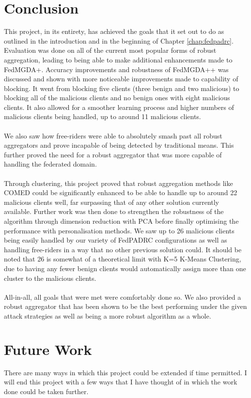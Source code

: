 \section{Conclusion}
This project, in its entirety, has achieved the goals that it set out to do as outlined in the introduction and in the beginning of Chapter \ref{chap:fedpadrc}.
Evaluation was done on all of the current most popular forms of robust aggregation, leading to being able to make additional enhancements made to FedMGDA+.
Accuracy improvements and robustness of FedMGDA++ was discussed and shown with more noticeable improvements made to capability of blocking.
It went from blocking five clients (three benign and two malicious) to blocking all of the malicious clients and no benign ones with eight malicious clients.
It also allowed for a smoother learning process and higher numbers of malicious clients being handled, up to around 11 malicious clients.
\\ \\
We also saw how free-riders were able to absolutely smash past all robust aggregators and prove incapable of being detected by traditional means.
This further proved the need for a robust aggregator that was more capable of handling the federated domain.
\\ \\
Through clustering, this project proved that robust aggregation methods like COMED could be significantly enhanced to be able to handle up to around 22 malicious clients well, far surpassing that of any other solution currently available.
Further work was then done to strengthen the robustness of the algorithm through dimension reduction with PCA before finally optimising the performance with personalisation methods.
We saw up to 26 malicious clients being easily handled by our variety of FedPADRC configurations as well as handling free-riders in a way that no other previous solution could.
It should be noted that 26 is somewhat of a theoretical limit with K=5 K-Means Clustering, due to having any fewer benign clients would automatically assign more than one cluster to the malicious clients.
\\ \\
All-in-all, all goals that were met were comfortably done so.
We also provided a robust aggregator that has been shown to be the best performing under the given attack strategies as well as being a more robust algorithm as a whole.

\section{Future Work}
There are many ways in which this project could be extended if time permitted.
I will end this project with a few ways that I have thought of in which the work done could be taken further.

